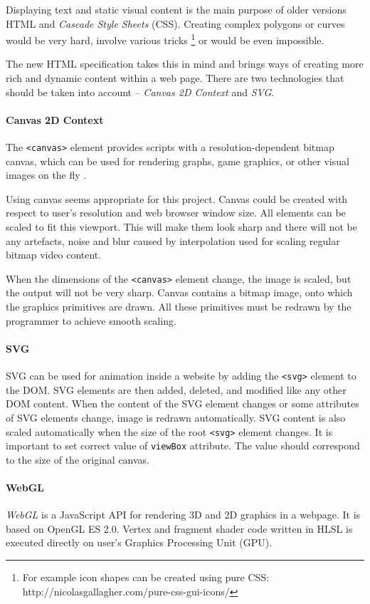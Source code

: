 Displaying text and static visual content is the main purpose of older versions HTML and \textit{Cascade Style Sheets} (CSS). Creating complex polygons or curves would be very hard, involve various tricks \footnote{For example icon shapes can be created using pure CSS: http://nicolasgallagher.com/pure-css-gui-icons/} or would be even impossible. 

The new HTML specification takes this in mind and brings ways of creating more rich and dynamic content within a web page. There are two technologies that should be taken into account -- \textit{Canvas 2D Context} and \textit{SVG}.

\paragraph{Canvas 2D Context}
The \verb|<canvas>| element provides scripts with a resolution-dependent bitmap canvas, which can be used for rendering graphs, game graphics, or other visual images on the fly \cite{html5_canvas}. 

Using canvas seems appropriate for this project. Canvas could be created with respect to user's resolution and web browser window size. All elements can be scaled to fit this viewport. This will make them look sharp and there will not be any artefacts, noise and blur caused by interpolation used for scaling regular bitmap video content.

When the dimensions of the \verb|<canvas>| element change, the image is scaled, but the output will not be very sharp. Canvas contains a bitmap image, onto which the graphics primitives are drawn. All these primitives must be redrawn by the programmer to achieve smooth scaling.

\paragraph{SVG}
SVG can be used for animation inside a website by adding the \verb|<svg>| element to the DOM. SVG elements are then added, deleted, and modified like any other DOM content. When the content of the SVG element changes or some attributes of SVG elements change, image is redrawn automatically. SVG content is also scaled automatically when the size of the root \verb|<svg>| element changes. It is important to set correct value of \verb|viewBox| attribute. The value should correspond to the size of the original canvas.

\paragraph{WebGL}
\textit{WebGL} is a JavaScript API for rendering 3D and 2D graphics in a webpage. It is based on OpenGL ES 2.0. Vertex and fragment shader code written in HLSL is executed directly on user's Graphics Processing Unit (GPU).


